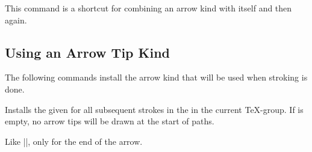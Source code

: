 \begin{command}{\pgfarrowsdeclaretriple{}}
  This command is a shortcut for combining an arrow kind with itself
  and then again.

\begin{codeexample}[]
%
\begin{pgfpicture}
  \pgfsetarrows{<<<->>>}
  \pgfsetlinewidth{1ex}
  \pgfpathmoveto{\pgfpointorigin}
  \pgfpathlineto{\pgfpoint{4cm}{2cm}}
\end{pgfpicture}
\end{codeexample} 
\end{command}





\subsection{Using an Arrow Tip Kind}

The following commands install the arrow kind that will be used when
stroking is done.

\begin{command}{\pgfsetarrowsstart{}}
  Installs the given  for all subsequent
  strokes in the in the current \TeX-group. If 
  is empty, no arrow tips will be drawn at the start of paths.
\begin{codeexample}[]
\begin{pgfpicture}
  \pgfsetlinewidth{1ex}
  \pgfpathmoveto{\pgfpointorigin}
  \pgfpathlineto{\pgfpoint{4cm}{2cm}}
\end{pgfpicture}
\end{codeexample} 
\end{command}

\begin{command}{\pgfsetarrowsend{}}
  Like |\pgfsetarrowsstart|, only for the end of the arrow.
\begin{codeexample}[]
\begin{pgfpicture}
  \pgfsetlinewidth{1ex}
  \pgfpathmoveto{\pgfpointorigin}
  \pgfpathlineto{\pgfpoint{4cm}{2cm}}
\end{pgfpicture}
\end{codeexample} 
\end{command}

